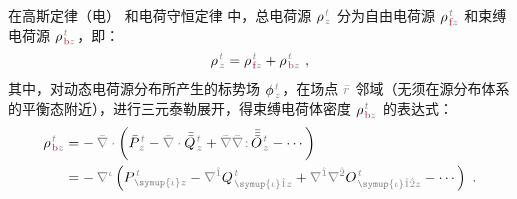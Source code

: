在高斯定律（电）  和电荷守恒定律  中，总电荷源 ${\rho}^{\;\!\mathcolor{gray}{t}}_{\;\!\mathcolor{gray}{z}}$ 分为自由电荷源 ${\rho}^{\;\!\mathcolor{gray}{t}}_{\;\!\textcolor{Maroon}{\text{f}}\mathcolor{gray}{z}}$ 和束缚电荷源 ${\rho}^{\;\!\mathcolor{gray}{t}}_{\;\!\textcolor{Maroon}{\text{b}}\mathcolor{gray}{z}}$\cite{langeMultipoleTheoryHehl2015,raabMultipoleTheoryElectromagnetism2004}，即：
\abovedisplayskip=10pt
\belowdisplayskip=10pt
\begin{align} \label{eq:p=f+b}
	{\rho}^{\;\!\mathcolor{gray}{t}}_{\;\!\mathcolor{gray}{z}} = {\rho}^{\;\!\mathcolor{gray}{t}}_{\;\!\textcolor{Maroon}{\text{f}}\mathcolor{gray}{z}} + {\rho}^{\;\!\mathcolor{gray}{t}}_{\;\!\textcolor{Maroon}{\text{b}}\mathcolor{gray}{z}}~,
\end{align}
其中，对动态电荷源分布所产生的标势场 $\phi^{\;\!\mathcolor{gray}{t}}_{\;\!\mathcolor{gray}{z}}$，在场点 $\mathcolor{gray}{\bar{r}}$ 邻域（无须在源分布体系的平衡态附近），进行三元泰勒展开，得束缚电荷体密度 ${\rho}^{\;\!\mathcolor{gray}{t}}_{\;\!\textcolor{Maroon}{\text{b}}\mathcolor{gray}{z}}$ 的表达式\cite{raabMultipoleTheoryElectromagnetism2004,delangeTranslationalInvariancePost2012,chen-zhuChenZhuxieUndergraduate_courses2024}：
\begin{subequations}
	\abovedisplayskip=-5pt
\begin{align}
	{\rho}^{\;\!\mathcolor{gray}{t}}_{\;\!\textcolor{Maroon}{\text{b}}\mathcolor{gray}{z}} &= -\hspace{0.2em} \mathcolor{gray}{\bar{\nabla} \cdot} \left( \bar{P}^{\;\!\mathcolor{gray}{t}}_{\;\!\mathcolor{gray}{z}} - \mathcolor{gray}{\bar{\nabla} \cdot} \bar{\bar{Q}}^{\;\!\mathcolor{gray}{t}}_{\;\!\mathcolor{gray}{z}} + \mathcolor{gray}{\bar{\nabla}} \mathcolor{gray}{\bar{\nabla} \colon}\! \bar{\bar{\bar{O}}}^{\;\!\mathcolor{gray}{t}}_{\;\!\mathcolor{gray}{z}} - \cdots \right) \label{eq:P-b} \\
	&= -\hspace{0.2em} \mathcolor{gray}{\nabla^\iota} \left( P^{\;\!\mathcolor{gray}{t}}_{\;\! \mathcolor{gray}{\symup{\iota}} \mathcolor{gray}{z}} - \mathcolor{gray}{\nabla^{\hat{1}}} Q^{\;\!\mathcolor{gray}{t}}_{\;\! \mathcolor{gray}{\symup{\iota} \hat{1}} \mathcolor{gray}{z}} + \mathcolor{gray}{\nabla^{\hat{1}}} \mathcolor{gray}{\nabla^{\hat{2}}} O^{\;\!\mathcolor{gray}{t}}_{\;\! \mathcolor{gray}{\symup{\iota} \hat{1} \hat{2}} \mathcolor{gray}{z}} - \cdots \right)~. \label{eq:p-b}
\end{align}
\end{subequations}

